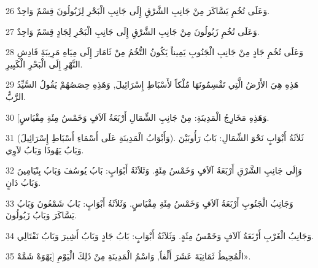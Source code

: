 \par 26 وَعَلَى تُخُمِ يَسَّاكَرَ مِنْ جَانِبِ الشَّرْقِ إِلَى جَانِبِ الْبَحْرِ لِزَبُولُونَ قِسْمٌ وَاحِدٌ.
\par 27 وَعَلَى تُخُمِ زَبُولُونَ مِنْ جَانِبِ الشَّرْقِ إِلَى جَانِبِ الْبَحْرِ لِجَادٍ قِسْمٌ وَاحِدٌ.
\par 28 وَعَلَى تُخُمِ جَادٍ مِنْ جَانِبِ الْجَنُوبِ يَمِيناً يَكُونُ التُّخُمُ مِنْ ثَامَارَ إِلَى مِيَاهِ مَرِيبَةَِ قَادِشِ النَّهْرِ إِلَى الْبَحْرِ الْكَبِيرِ.
\par 29 هَذِهِ هِيَ الأَرْضُ الَّتِي تَقْسِمُونَهَا مُلْكاً لأَسْبَاطِ إِسْرَائِيلَ, وَهَذِهِ حِصَصُهُمْ يَقُولُ السَّيِّدُ الرَّبُّ.
\par 30 [وَهَذِهِ مَخَارِجُ الْمَدِينَةِ: مِنْ جَانِبِ الشِّمَالِ أَرْبَعَةُ آلاَفٍ وَخَمْسُ مِئَةِ مِقْيَاسٍ.
\par 31 (وَأَبْوَابُ الْمَدِينَةِ عَلَى أَسْمَاءِ أَسْبَاطِ إِسْرَائِيلَ). ثَلاَثَةُ أَبْوَابٍ نَحْوَ الشِّمَالِ: بَابُ رَأُوبَيْنَ وَبَابُ يَهُوذَا وَبَابُ لاَوِي.
\par 32 وَإِلَى جَانِبِ الشَّرْقِ أَرْبَعَةُ آلاَفٍ وَخَمْسُ مِئَةٍ. وَثَلاَثَةُ أَبْوَابٍ: بَابُ يُوسُفَ وَبَابُ بِنْيَامِينَ وَبَابُ دَانٍ.
\par 33 وَجَانِبُ الْجَنُوبِ أَرْبَعَةُ آلاَفٍ وَخَمْسُ مِئَةِ مِقْيَاسٍ. وَثَلاَثَةُ أَبْوَابٍ: بَابُ شَمْعُونَ وَبَابُ يَسَّاكَرَ وَبَابُ زَبُولُونَ.
\par 34 وَجَانِبُ الْغَرْبِ أَرْبَعَةُ آلاَفٍ وَخَمْسُ مِئَةٍ. وَثَلاَثَةُ أَبْوَابٍ: بَابُ جَادٍ وَبَابُ أَشِيرَ وَبَابُ نَفْتَالِي.
\par 35 الْمُحِيطُ ثَمَانِيَةَ عَشَرَ أَلْفاً, وَاسْمُ الْمَدِينَةِ مِنْ ذَلِكَ الْيَوْمِ [يَهْوَهْ شَمَّهْ».

